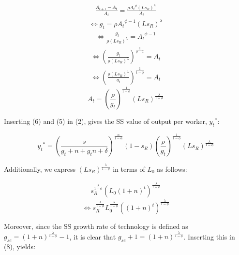 \documentclass[11pt]{article} %
\begin{document}
\begin{align*}
    \frac{A_{t+1}-A_t}{A_t} = \frac{{\rho}{A_t}^{\phi}(Ls_R)^{\lambda}}{A_t}
\end{align*}
\begin{align*}
    \Longleftrightarrow g_t = {\rho}{A_t}^{\phi-1}(Ls_R)^{\lambda}
\end{align*}
\begin{align*}
    \Longleftrightarrow \frac{g_t}{\rho(Ls_R)^{\lambda}} = {A_t}^{\phi-1}
\end{align*}
\begin{align*}
    \Longleftrightarrow \left(\frac{g_t}{\rho(Ls_R)^{\lambda}}\right)^{\frac{1}{\phi-1}} = {A_t}
\end{align*}
\begin{align*}
    \Longleftrightarrow\left(\frac{\rho(Ls_R)^{\lambda}}{g_t}\right)^{\frac{1}{1-\phi}} = {A_t}
\end{align*}
\begin{equation}
    A_t=\left(\frac{\rho}{g_t}\right)^{\frac{1}{1-\phi}}(Ls_R)^{\frac{\lambda}{1-\phi}}
\end{equation}

\par Inserting (6) and (5) in (2), gives the SS value of output per worker, ${y_t}^*$:

\begin{equation}
    {y_t}^* = \left(\frac{s}{g_t+n+g_tn+\delta}\right)^{\frac{\alpha}{1-\alpha}}(1-s_R) \left(\frac{\rho}{g_t}\right)^{\frac{1}{1-\phi}}(Ls_R)^{\frac{\lambda}{1-\phi}}
\end{equation}

\bigskip\par Additionally, we express $(Ls_R)^{\frac{\lambda}{1-\phi}}$ in terms of $L_0$ as follows:

\begin{align*}
    s_R^{\frac{\lambda}{1-\phi}}\left(L_0(1+n)^{t}\right)^{\frac{\lambda}{1-\phi}}
\end{align*}
\begin{equation}
    \Longleftrightarrow s_R^{\frac{\lambda}{1-\phi}}L_0^{\frac{\lambda}{1-\phi}}\left((1+n)^{t}\right)^{\frac{\lambda}{1-\phi}}
\end{equation}

\bigskip\par Moreover, since the SS growth rate of technology is defined as $g_{se}=(1+n)^{\frac{\lambda}{1-\phi}}-1$, it is clear that $g_{se}+1=(1+n)^{\frac{\lambda}{1-\phi}}$. Inserting this in (8), yields:
\end{document}
